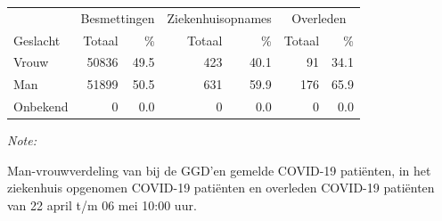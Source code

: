 \documentclass[
  english,
  man,floatsintext]{apa6}
\begin{document}
\begin{table}
\centering\begingroup\fontsize{11}{13}\selectfont

\begin{threeparttable}
\begin{tabular}{lrrrrrr}
\toprule
\multicolumn{1}{c}{ } & \multicolumn{2}{c}{Besmettingen} & \multicolumn{2}{c}{Ziekenhuisopnames} & \multicolumn{2}{c}{Overleden} \\
\cmidrule(l{3pt}r{3pt}){2-3} \cmidrule(l{3pt}r{3pt}){4-5} \cmidrule(l{3pt}r{3pt}){6-7}
Geslacht & Totaal & \% & Totaal & \% & Totaal & \%\\
\midrule
Vrouw & 50836 & 49.5 & 423 & 40.1 & 91 & 34.1\\
Man & 51899 & 50.5 & 631 & 59.9 & 176 & 65.9\\
Onbekend & 0 & 0.0 & 0 & 0.0 & 0 & 0.0\\
\bottomrule
\end{tabular}
\begin{tablenotes}
\item \textit{Note: } 
\item Man-vrouwverdeling van bij de GGD’en gemelde COVID-19 patiënten, in het ziekenhuis opgenomen COVID-19 patiënten en overleden COVID-19 patiënten van 22 april t/m 06 mei 10:00 uur.
\end{tablenotes}
\end{threeparttable}
\endgroup{}
\end{table}
\newpage
\end{document}
